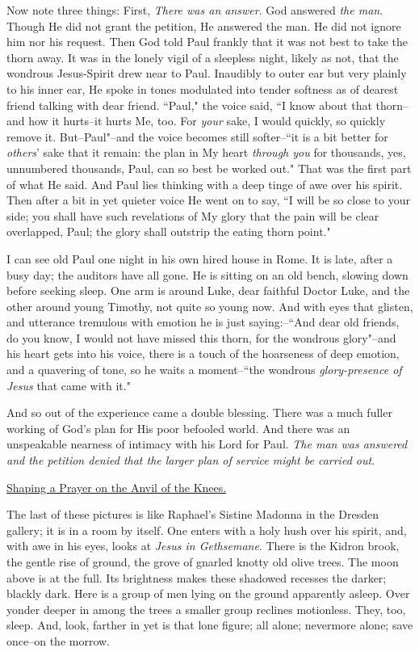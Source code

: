 Now note three things: First, \textit{There was an answer}. God answered \textit{the
man}. Though He did not grant the petition, He answered the man. He did
not ignore him nor his request. Then God told Paul frankly that it was not
best to take the thorn away. It was in the lonely vigil of a sleepless
night, likely as not, that the wondrous Jesus-Spirit drew near to Paul.
Inaudibly to outer ear but very plainly to his inner ear, He spoke in
tones modulated into tender softness as of dearest friend talking with
dear friend. ``Paul," the voice said, ``I know about that thorn--and how it
hurts--it hurts Me, too. For \textit{your} sake, I would quickly, so quickly
remove it. But--Paul"--and the voice becomes still softer--``it is a bit
better for \textit{others}' sake that it remain: the plan in My heart \textit{through
you} for thousands, yes, unnumbered thousands, Paul, can so best be worked
out." That was the first part of what He said. And Paul lies thinking with
a deep tinge of awe over his spirit. Then after a bit in yet quieter voice
He went on to say, ``I will be so close to your side; you shall have such
revelations of My glory that the pain will be clear overlapped, Paul; the
glory shall outstrip the eating thorn point."

I can see old Paul one night in his own hired house in Rome. It is late,
after a busy day; the auditors have all gone. He is sitting on an old
bench, slowing down before seeking sleep. One arm is around Luke, dear
faithful Doctor Luke, and the other around young Timothy, not quite so
young now. And with eyes that glisten, and utterance tremulous with
emotion he is just saying:--``And dear old friends, do you know, I would
not have missed this thorn, for the wondrous glory"--and his heart gets
into his voice, there is a touch of the hoarseness of deep emotion, and a
quavering of tone, so he waits a moment--``the wondrous \textit{glory-presence of
Jesus} that came with it."

And so out of the experience came a double blessing. There was a much
fuller working of God's plan for His poor befooled world. And there was an
unspeakable nearness of intimacy with his Lord for Paul. \textit{The man was
answered and the petition denied that the larger plan of service might be
carried out}.



\underline{Shaping a Prayer on the Anvil of the Knees.}


The last of these pictures is like Raphael's Sistine Madonna in the
Dresden gallery; it is in a room by itself. One enters with a holy hush
over his spirit, and, with awe in his eyes, looks at \textit{Jesus in
Gethsemane}. There is the Kidron brook, the gentle rise of ground, the
grove of gnarled knotty old olive trees. The moon above is at the full.
Its brightness makes these shadowed recesses the darker; blackly dark.
Here is a group of men lying on the ground apparently asleep. Over yonder
deeper in among the trees a smaller group reclines motionless. They, too,
sleep. And, look, farther in yet is that lone figure; all alone; nevermore
alone; save once--on the morrow.

